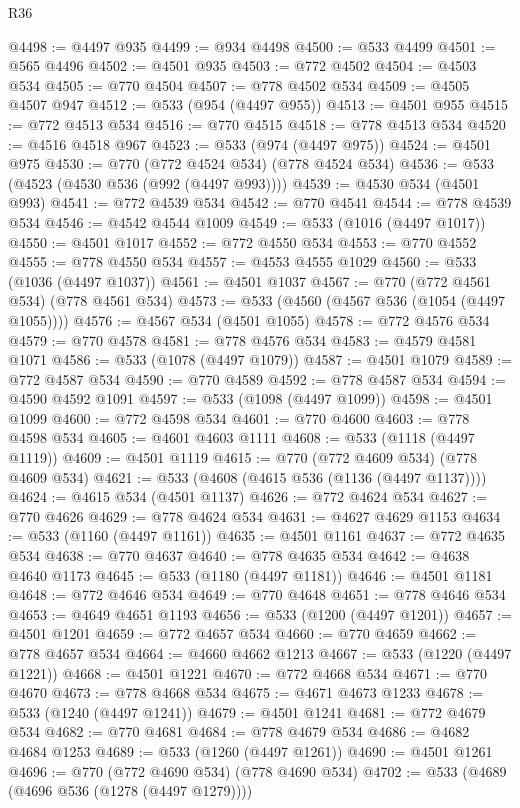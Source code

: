 \begin{lexlean}{R36}
\begin{coremodule}
@4498 := @4497 @935
@4499 := @934 @4498
@4500 := @533 @4499
@4501 := @565 @4496
@4502 := @4501 @935
@4503 := @772 @4502
@4504 := @4503 @534
@4505 := @770 @4504
@4507 := @778 @4502 @534
@4509 := @4505 @4507 @947
@4512 := @533 (@954 (@4497 @955))
@4513 := @4501 @955
@4515 := @772 @4513 @534
@4516 := @770 @4515
@4518 := @778 @4513 @534
@4520 := @4516 @4518 @967
@4523 := @533 (@974 (@4497 @975))
@4524 := @4501 @975
@4530 := @770 (@772 @4524 @534) (@778 @4524 @534)
@4536 := @533 (@4523 (@4530 @536 (@992 (@4497 @993))))
@4539 := @4530 @534 (@4501 @993)
@4541 := @772 @4539 @534
@4542 := @770 @4541
@4544 := @778 @4539 @534
@4546 := @4542 @4544 @1009
@4549 := @533 (@1016 (@4497 @1017))
@4550 := @4501 @1017
@4552 := @772 @4550 @534
@4553 := @770 @4552
@4555 := @778 @4550 @534
@4557 := @4553 @4555 @1029
@4560 := @533 (@1036 (@4497 @1037))
@4561 := @4501 @1037
@4567 := @770 (@772 @4561 @534) (@778 @4561 @534)
@4573 := @533 (@4560 (@4567 @536 (@1054 (@4497 @1055))))
@4576 := @4567 @534 (@4501 @1055)
@4578 := @772 @4576 @534
@4579 := @770 @4578
@4581 := @778 @4576 @534
@4583 := @4579 @4581 @1071
@4586 := @533 (@1078 (@4497 @1079))
@4587 := @4501 @1079
@4589 := @772 @4587 @534
@4590 := @770 @4589
@4592 := @778 @4587 @534
@4594 := @4590 @4592 @1091
@4597 := @533 (@1098 (@4497 @1099))
@4598 := @4501 @1099
@4600 := @772 @4598 @534
@4601 := @770 @4600
@4603 := @778 @4598 @534
@4605 := @4601 @4603 @1111
@4608 := @533 (@1118 (@4497 @1119))
@4609 := @4501 @1119
@4615 := @770 (@772 @4609 @534) (@778 @4609 @534)
@4621 := @533 (@4608 (@4615 @536 (@1136 (@4497 @1137))))
@4624 := @4615 @534 (@4501 @1137)
@4626 := @772 @4624 @534
@4627 := @770 @4626
@4629 := @778 @4624 @534
@4631 := @4627 @4629 @1153
@4634 := @533 (@1160 (@4497 @1161))
@4635 := @4501 @1161
@4637 := @772 @4635 @534
@4638 := @770 @4637
@4640 := @778 @4635 @534
@4642 := @4638 @4640 @1173
@4645 := @533 (@1180 (@4497 @1181))
@4646 := @4501 @1181
@4648 := @772 @4646 @534
@4649 := @770 @4648
@4651 := @778 @4646 @534
@4653 := @4649 @4651 @1193
@4656 := @533 (@1200 (@4497 @1201))
@4657 := @4501 @1201
@4659 := @772 @4657 @534
@4660 := @770 @4659
@4662 := @778 @4657 @534
@4664 := @4660 @4662 @1213
@4667 := @533 (@1220 (@4497 @1221))
@4668 := @4501 @1221
@4670 := @772 @4668 @534
@4671 := @770 @4670
@4673 := @778 @4668 @534
@4675 := @4671 @4673 @1233
@4678 := @533 (@1240 (@4497 @1241))
@4679 := @4501 @1241
@4681 := @772 @4679 @534
@4682 := @770 @4681
@4684 := @778 @4679 @534
@4686 := @4682 @4684 @1253
@4689 := @533 (@1260 (@4497 @1261))
@4690 := @4501 @1261
@4696 := @770 (@772 @4690 @534) (@778 @4690 @534)
@4702 := @533 (@4689 (@4696 @536 (@1278 (@4497 @1279))))

\end{coremodule}
\end{lexlean}
